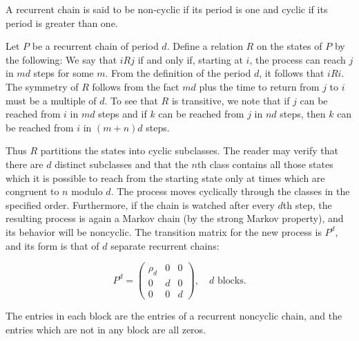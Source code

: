 A recurrent chain is said to be non-cyclic if its period is one and cyclic if its period is greater than one.

Let $P$ be a recurrent chain of period $d$. Define a relation $R$ on the states of $P$ by the following: We say that $i R j$ if and only if, starting at $i$, the process can reach $j$ in $md$ steps for some $m$. From the definition of the period $d$, it follows that $i R i$. The symmetry of $R$ follows from the fact $md$ plus the time to return from $j$ to $i$ must be a multiple of $d$. To see that $R$ is transitive, we note that if $j$ can be reached from $i$ in $md$ steps and if $k$ can be reached from $j$ in $nd$ steps, then $k$ can be reached from $i$ in $(m + n)d$ steps.

Thus $R$ partitions the states into cyclic subclasses. The reader may verify that there are $d$ distinct subclasses and that the $n$th class contains all those states which it is possible to reach from the starting state only at times which are congruent to $n$ modulo $d$. The process moves cyclically through the classes in the specified order. Furthermore, if the chain is watched after every $d$th step, the resulting process is again a Markov chain (by the strong Markov property), and its behavior will be noncyclic. The transition matrix for the new process is $P^d$, and its form is that of $d$ separate recurrent chains:

$$P^d = \begin{pmatrix} \rho_d & 0 & 0 \\ 0 & d & 0 \\ 0 & 0 & d \end{pmatrix}, \quad d \text{ blocks.}$$

The entries in each block are the entries of a recurrent noncyclic chain, and the entries which are not in any block are all zeros.
